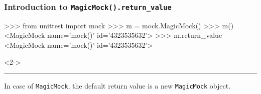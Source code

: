 \documentclass[xcolor={svgnames}]{beamer}
\newcommand{\ttcode}[2][]{\lstinline[style=plain,basicstyle=\ttfamily#1]{#2}}
\newcommand{\pycode}[2][]{\lstinline[style=python,#1]{#2}}
\newcommand{\hr}[2]{\vspace{#1}\hrule height 0.01mm\vspace{#2}}
\begin{document}
\begin{frame}[t,fragile]
    \frametitle{Introduction to \ttcode{MagicMock().return_value}}

    \begin{pyenv}[gobble=8]
        >>> from unittest import mock
        >>> m = mock.MagicMock()
        >>> m()
        <MagicMock name='mock()' id='4323535632'>
        >>> m.return_value
        <MagicMock name='mock()' id='4323535632'>
    \end{pyenv}

    \begin{onlyenv}<2->
        \hr{0.5mm}{0.5mm}
        In case of \pycode{MagicMock}, the default return value is a new
        \pycode{MagicMock} object.
    \end{onlyenv}
\end{frame}
\end{document}

